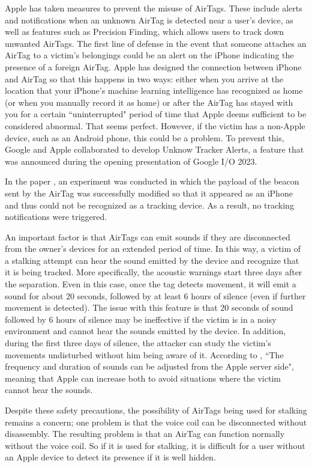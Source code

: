 \documentclass[english]{article}
\begin{document}
Apple has taken measures to prevent the misuse of AirTags. These include alerts and notifications when an unknown AirTag is detected near a user's device, as well as features such as Precision Finding, which allows users to track down unwanted AirTags. The first line of defense in the event that someone attaches an AirTag to a victim's belongings could be an alert on the iPhone indicating the presence of a foreign AirTag. Apple has designed the connection between iPhone and AirTag so that this happens in two ways: either when you arrive at the location that your iPhone's machine learning intelligence has recognized as home (or when you manually record it as home) or after the AirTag has stayed with you for a certain ``uninterrupted" period of time that Apple deems sufficient to be considered abnormal. That seems perfect. However, if the victim has a non-Apple device, such as an Android phone, this could be a problem. To prevent this, Google and Apple collaborated to develop Unknow Tracker Alerts, a feature that was announced during the opening presentation of Google I/O 2023.

In the paper \cite{shafqat2023track}, an experiment was conducted in which the payload of the beacon sent by the AirTag was successfully modified so that it appeared as an iPhone and thus could not be recognized as a tracking device. As a result, no tracking notifications were triggered.

An important factor is that AirTags can emit sounds if they are disconnected from the owner's devices for an extended period of time. In this way, a victim of a stalking attempt can hear the sound emitted by the device and recognize that it is being tracked. More specifically, the acoustic warnings start three days after the separation. Even in this case, once the tag detects movement, it will emit a sound for about 20 seconds, followed by at least 6 hours of silence (even if further movement is detected). The issue with this feature is that 20 seconds of sound followed by 6 hours of silence may be ineffective if the victim is in a noisy environment and cannot hear the sounds emitted by the device. In addition, during the first three days of silence, the attacker can study the victim's movements undisturbed without him being aware of it. According to \cite{server}, ``The frequency and duration of sounds can be adjusted from the Apple server side", meaning that Apple can increase both to avoid situations where the victim cannot hear the sounds.

Despite these safety precautions, the possibility of AirTags being used for stalking remains a concern; one problem is that the voice coil can be disconnected without disassembly. The resulting problem is that an AirTag can function normally without the voice coil. So if it is used for stalking, it is difficult for a user without an Apple device to detect its presence if it is well hidden.
\end{document}
